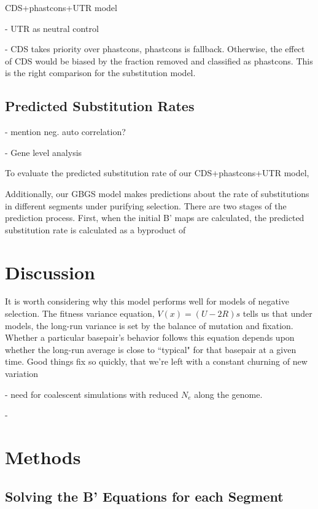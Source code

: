 \documentclass[11pt]{article}
\begin{document}
CDS+phastcons+UTR model

 - UTR as neutral control

 - CDS takes priority over phastcons, phastcons is fallback. Otherwise, the
   effect of CDS would be biased by the fraction removed and classified as
   phastcons. This is the right comparison for the substitution model.

\subsection*{Predicted Substitution Rates}

- mention neg. auto correlation?

- Gene level analysis

To evaluate the predicted substitution rate of our CDS+phastcons+UTR model, 


Additionally, our GBGS model makes predictions about the rate of substitutions
in different segments under purifying selection. There are two stages of the
prediction process. First, when the initial B' maps are calculated, the
predicted substitution rate is calculated as a byproduct of 

\section*{Discussion}

It is worth considering why this model performs well for models of negative
selection. The fitness variance equation, $V(x) = (U-2R)s$ tells us that under
models, the long-run variance is set by the balance of mutation and fixation.
Whether a particular basepair's behavior follows this equation depends upon
whether the long-run average is close to ``typical" for that basepair at a
given time. Good things fix so quickly, that we're left with a constant
churning of new variation

- need for coalescent simulations with reduced $N_e$ along the genome.

-  


\section*{Methods}

\subsection*{Solving the B' Equations for each Segment}
\end{document}

